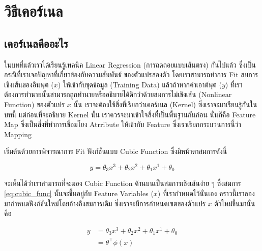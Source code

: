 

\chapter{วิธีเคอร์เนล}
\label{ch:kernel}

\section{เคอร์เนลคืออะไร}

ในบทที่แล้วเราได้เรียนรู้เทคนิค Linear Regression (การถดถอยแบบเส้นตรง) กันไปแล้ว ซึ่งเป็นกรณีที่เราเจอปัญหาที่เกี่ยวข้องกับความสัมพันธ์%
ของตัวแปรสองตัว โดยเราสามารถทำการ Fit สมการเชิงเส้นของอินพุต ($x$) ให้เข้ากับชุดข้อมูล (Training Data) แล้วถ้าหากค่าเอาต์พุต 
($y$) ที่เราต้องการทำนายนั้นสามารถถูกทำนายหรืออธิบายได้ดีกว่าด้วยสมการไม่เชิงเส้น (Nonlinear Function) ของตัวแปร $x$ นั้น 
เราจะต้องใช้สิ่งที่เรียกว่าเคอร์เนล (Kernel) ซึ่งเราจะมาเรียนรู้กันในบทนี้ แต่ก่อนที่จะอธิบาย Kernel นั้น เราควรจะมาเข้าใจสิ่งที่เป็นพื้นฐานกันก่อน%
นั่นก็คือ Feature Map ซึ่งเป็นสิ่งที่ทำการเชื่อมโยง Atrribute ให้เข้ากับ Feature ซึ่งเราเรียกกระบวนการนี้ว่า Mapping 

เริ่มต้นด้วยการพิจารณาการ Fit ฟังก์ชันแบบ Cubic Function ซึ่งมีหน้าตาสมการดังนี้

\begin{equation}\label{eq:cubic_func}
    y = \theta_{3}x^{3} + \theta_{2}x^{2} + \theta_{1}x^{1} + \theta_{0}
\end{equation}

จะเห็นได้ว่าเราสามารถที่จะมอง Cubic Function ด้านบนเป็นสมการเชิงเส้นง่าย ๆ ซึ่งสมการ \ref{eq:cubic_func} นั้นจะขึ้นอยู่กับ Feature 
Variables ($x$) ที่เรากำหนดไว้นั่นเอง คราวนี้เราลองมากำหนดฟังก์ชันใหม่โดยอ้างอิงสมการเดิม ซึ่งเราจะมีการกำหนดเซตของตัวแปร $x$ 
ตัวใหม่ขึ้นมานั่นคือ

\begin{align}\label{eq:cubic_func_2}
    y &= \theta_{3}x^{3} + \theta_{2}x^{2} + \theta_{1}x^{1} + \theta_{0} \nonumber \\ 
      &= \theta^{\top}\phi(x)
\end{align}

